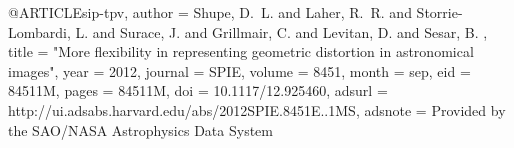 
@ARTICLE{sip-tpv,
   author = {{Shupe}, D.~L. and {Laher}, R.~R. and {Storrie-Lombardi}, L. and
	{Surace}, J. and {Grillmair}, C. and {Levitan}, D. and {Sesar}, B.
	},
    title = "{More flexibility in representing geometric distortion in astronomical images}",
     year = 2012,
   journal = {SPIE},
   volume = 8451,
    month = sep,
      eid = {84511M},
    pages = {84511M},
      doi = {10.1117/12.925460},
   adsurl = {http://ui.adsabs.harvard.edu/abs/2012SPIE.8451E..1MS},
  adsnote = {Provided by the SAO/NASA Astrophysics Data System}
}
